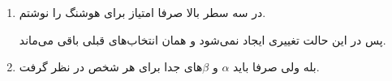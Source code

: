 \begin{enumerate}
\begin{figure*}[h]
{        }
    \end{figure*}
    \item در سه سطر بالا صرفا امتیاز برای هوشنگ را نوشتم.
        \begin{center}
    \end{center}
    پس در این حالت تغییری ایجاد نمی‌شود و همان انتخاب‌های قبلی باقی می‌ماند.
    \item بله ولی صرفا باید $\alpha$ و $\beta$های جدا برای هر شخص در نظر گرفت.
\end{enumerate}